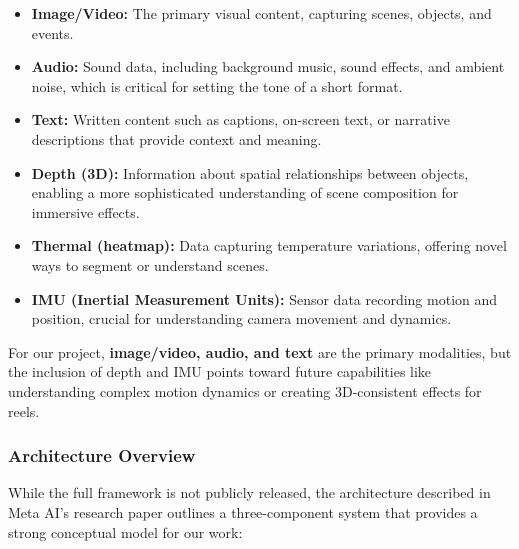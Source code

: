 \documentclass[12pt,a4paper,oneside,english]{book}
\begin{document}
\begin{itemize}
    \item \textbf{Image/Video:} The primary visual content, capturing scenes, objects, and events.
    \item \textbf{Audio:} Sound data, including background music, sound effects, and ambient noise, which is critical for setting the tone of a short format.
    \item \textbf{Text:} Written content such as captions, on-screen text, or narrative descriptions that provide context and meaning.
    \item \textbf{Depth (3D):} Information about spatial relationships between objects, enabling a more sophisticated understanding of scene composition for immersive effects.
    \item \textbf{Thermal (heatmap):} Data capturing temperature variations, offering novel ways to segment or understand scenes.
    \item \textbf{IMU (Inertial Measurement Units):} Sensor data recording motion and position, crucial for understanding camera movement and dynamics.
\end{itemize}

For our project, \textbf{image/video, audio, and text} are the primary modalities, but the inclusion of depth and IMU points toward future capabilities like understanding complex motion dynamics or creating 3D-consistent effects for reels.

\subsubsection{Architecture Overview}
\label{subsubsec:architecture_overview}

While the full framework is not publicly released, the architecture described in Meta AI's research paper outlines a three-component system that provides a strong conceptual model for our work:
\end{document}
